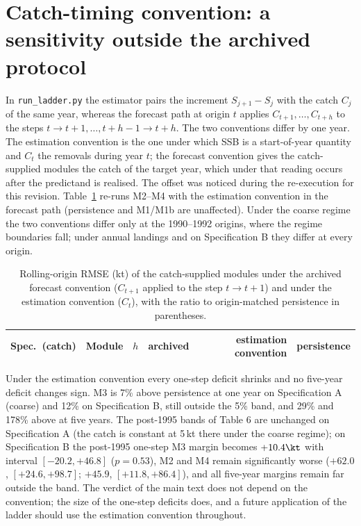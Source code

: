 \FloatBarrier
\section{Catch-timing convention: a sensitivity outside the archived protocol}\label{si:timing}

In \texttt{run\_ladder.py} the estimator pairs the increment $S_{j+1}-S_j$ with the catch $C_j$ of the same year, whereas the forecast path at origin $t$ applies $C_{t+1},\dots,C_{t+h}$ to the steps $t\to t+1,\dots,t+h-1\to t+h$. The two conventions differ by one year. The estimation convention is the one under which SSB is a start-of-year quantity and $C_t$ the removals during year $t$; the forecast convention gives the catch-supplied modules the catch of the target year, which under that reading occurs after the predictand is realised. The offset was noticed during the re-execution for this revision. Table~\ref{tab:si_timing} re-runs M2--M4 with the estimation convention in the forecast path (persistence and M1/M1b are unaffected). Under the coarse regime the two conventions differ only at the 1990--1992 origins, where the regime boundaries fall; under annual landings and on Specification B they differ at every origin.

\begin{table}[!htb]
\centering\small
\caption{Rolling-origin RMSE (kt) of the catch-supplied modules under the archived forecast convention ($C_{t+1}$ applied to the step $t\to t+1$) and under the estimation convention ($C_t$), with the ratio to origin-matched persistence in parentheses.}
\label{tab:si_timing}
\begin{tabular}{@{}llcrrr@{}}
\toprule
Spec.\ (catch) & Module & $h$ & archived & estimation convention & persistence \\
\midrule

\bottomrule
\end{tabular}
\end{table}

Under the estimation convention every one-step deficit shrinks and no five-year deficit changes sign. M3 is 7\% above persistence at one year on Specification A (coarse) and 12\% on Specification B, still outside the 5\% band, and 29\% and 178\% above at five years. The post-1995 bands of Table 6 are unchanged on Specification A (the catch is constant at 5\,kt there under the coarse regime); on Specification B the post-1995 one-step M3 margin becomes $+10.4\kt$ with interval $[-20.2, +46.8]$ ($p = 0.53$), M2 and M4 remain significantly worse ($+62.0$, $[+24.6, +98.7]$; $+45.9$, $[+11.8, +86.4]$), and all five-year margins remain far outside the band. The verdict of the main text does not depend on the convention; the size of the one-step deficits does, and a future application of the ladder should use the estimation convention throughout.

